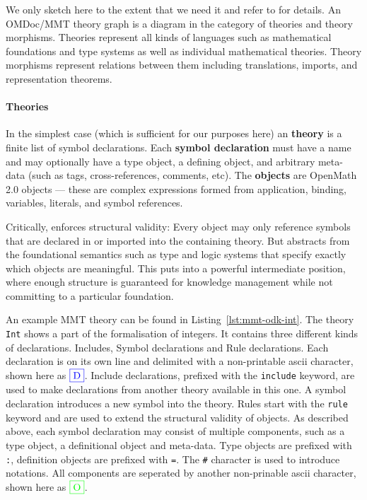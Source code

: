 We only sketch \MMT here to the extent that we need it and refer to \cite{RabKoh:WSMSML13} for details.
An OMDoc/MMT theory graph is a diagram in the category of \MMT theories and theory morphisms.
Theories represent all kinds of languages such as mathematical foundations and type systems as well as individual mathematical theories.
Theory morphisms represent relations between them including translations, imports, and representation theorems.

\paragraph{Theories}
In the simplest case (which is sufficient for our purposes here) an \MMT \textbf{theory} is a finite list of symbol declarations.
Each \textbf{symbol declaration} must have a name and may optionally have a type object, a defining object, and arbitrary meta-data (such as tags, cross-references, comments, etc).
The \textbf{objects} are OpenMath 2.0 objects \cite{BusCapCar:2oms04} --- these are complex expressions formed from application, binding, variables, literals, and symbol references.

Critically, \MMT enforces structural validity: Every object may only reference symbols that are declared in or imported into the containing theory.
But \MMT abstracts from the foundational semantics such as type and logic systems that specify exactly which objects are meaningful.
This puts \MMT into a powerful intermediate position, where enough structure is guaranteed for knowledge management while not committing to a particular foundation.

An example MMT theory can be found in Listing~\ref{lst:mmt-odk-int}.
The theory \texttt{Int} shows a part of the formalisation of integers.
It contains three different kinds of declarations. Includes, Symbol declarations and Rule declarations.
Each declaration is on its own line and delimited with a non-printable ascii character, shown here as $\RS$.
Include declarations, prefixed with the \texttt{include} keyword, are used to make declarations from another theory available in this one.
A symbol declaration introduces a new symbol into the theory.
Rules start with the \texttt{rule} keyword and are used to extend the structural validity of objects.
As described above, each symbol declaration may consist of multiple components, such as a type object, a definitional object and meta-data.
Type objects are prefixed with \texttt{:}, definition objects are prefixed with \texttt{=}.
The \texttt{\#} character is used to introduce notations.
All components are seperated by another non-prinable ascii character, shown here as $\US$.


